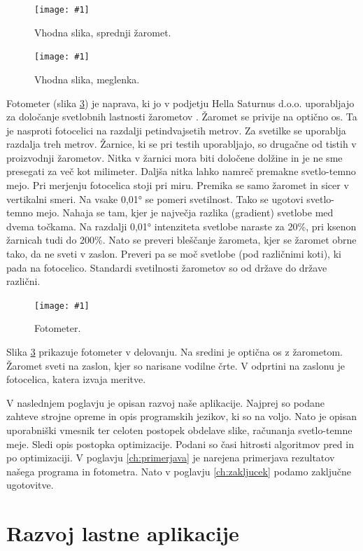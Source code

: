\documentclass[oneside, a4paper, 12pt]{book}
\newcommand{\slika}[3]{
	\begin{figure}
	\begin{center}
	\texttt{[image: \#1]}
	\end{center}
	\vspace{-20pt}
	\caption{#2}
	\label{#3}
	\end{figure}
}
\begin{document}
\slika{slike/original.jpg}{Vhodna slika, sprednji žaromet.}{pic:vhp1}
\slika{slike/levi3.JPG}{Vhodna slika, meglenka.}{pic:vhp2}

Fotometer (slika \ref{pic:fotometer}) je naprava, ki jo v podjetju Hella 
Saturnus d.o.o. uporabljajo za določanje svetlobnih lastnosti žarometov 
\cite{hella-fotometer}. Žaromet se privije na optično os. Ta je nasproti 
fotocelici na razdalji petindvajsetih metrov. Za svetilke se uporablja 
razdalja treh metrov. Žarnice, ki se pri testih uporabljajo, so drugačne 
od tistih v proizvodnji žarometov. Nitka v žarnici mora biti določene 
dolžine in je ne sme presegati za več kot milimeter. Daljša nitka lahko 
namreč premakne svetlo-temno mejo. Pri merjenju fotocelica stoji pri miru. 
Premika se samo žaromet in sicer v vertikalni smeri. Na vsake 0,01° se 
pomeri svetilnost. Tako se ugotovi svetlo-temno mejo. Nahaja se tam, 
kjer je največja razlika (gradient) svetlobe med dvema točkama. Na 
razdalji 0,01° intenziteta svetlobe naraste za 20\%, pri ksenon žarnicah 
tudi do 200\%. Nato se preveri bleščanje žarometa, kjer se žaromet obrne 
tako, da ne sveti v zaslon. Preveri pa se moč svetlobe (pod različnimi 
koti), ki pada na fotocelico. Standardi svetilnosti žarometov so od države 
do države različni. 

\slika{slike/Photometer.jpg}{Fotometer.}{pic:fotometer}
Slika \ref{pic:fotometer} prikazuje fotometer v delovanju. Na sredini je 
optična os z žarometom. Žaromet sveti na zaslon, kjer so narisane vodilne 
črte. V odprtini na zaslonu je fotocelica, katera izvaja meritve.

V naslednjem poglavju je opisan razvoj naše aplikacije. Najprej so 
podane zahteve strojne opreme in opis programskih jezikov, ki so na 
voljo. Nato je opisan uporabniški vmesnik ter celoten postopek obdelave 
slike, računanja svetlo-temne meje. Sledi opis postopka optimizacije. 
Podani so časi hitrosti algoritmov pred in po optimizaciji. V poglavju 
\ref{ch:primerjava} je narejena primerjava rezultatov našega programa 
in fotometra. Nato v poglavju \ref{ch:zakljucek} podamo zaključne 
ugotovitve.

\chapter{Razvoj lastne aplikacije}
\end{document}
